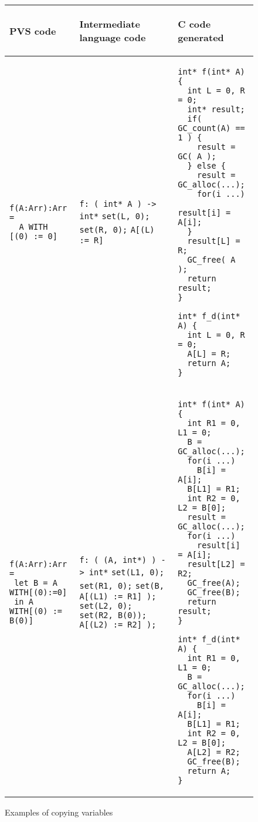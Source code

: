 \documentclass[12pt,a4paper]{article}
\newcommand{\cl}[1]{\texttt{#1}}
\begin{document}
\begin{figure}[!ht]
\begin{tabular}{|p{5.5cm}|p{5.5cm}|p{6cm}|}
\hline
\begin{center}
PVS code
\end{center} &
\begin{center}
Intermediate language code
\end{center} &
\begin{center}
C code generated
\end{center} \\ \hline

\begin{lstlisting}
f(A:Arr):Arr =
  A WITH [(0) := 0]
\end{lstlisting} &
\cl{f: ( int* A ) -> int*} \newline
\cl{set(L, 0);} \newline
\cl{set(R, 0);} \newline
\cl{A[(L) := R]} &
\begin{lstlisting}
int* f(int* A) {
  int L = 0, R = 0;
  int* result;
  if( GC_count(A) == 1 ) {
    result = GC( A );
  } else {
    result = GC_alloc(...);
    for(i ...)
      result[i] = A[i];
  }
  result[L] = R;
  GC_free( A );
  return result;
}

int* f_d(int* A) {
  int L = 0, R = 0;
  A[L] = R;
  return A;
}
\end{lstlisting} \\ \hline

\begin{lstlisting}
f(A:Arr):Arr =
 let B = A WITH[(0):=0]
 in A WITH[(0) := B(0)]
\end{lstlisting} &
\cl{f: ( (A, int*) ) -> int*} \newline
\cl{set(L1, 0);} \newline
\cl{set(R1, 0);} \newline
\cl{set(B, A[(L1) := R1] );} \newline
\cl{set(L2, 0);} \newline
\cl{set(R2, B(0));} \newline
\cl{A[(L2) := R2] );} &
\begin{lstlisting}
int* f(int* A) {
  int R1 = 0, L1 = 0;
  B = GC_alloc(...);
  for(i ...)
    B[i] = A[i];
  B[L1] = R1;
  int R2 = 0, L2 = B[0];
  result = GC_alloc(...);
  for(i ...)
    result[i] = A[i];
  result[L2] = R2;
  GC_free(A);
  GC_free(B);
  return result;
}

int* f_d(int* A) {
  int R1 = 0, L1 = 0;
  B = GC_alloc(...);
  for(i ...)
    B[i] = A[i];
  B[L1] = R1;
  int R2 = 0, L2 = B[0];
  A[L2] = R2;
  GC_free(B);
  return A;
}
\end{lstlisting} \\ \hline
\end{tabular}
\caption{Examples of copying variables}
\end{figure}
\end{document}
